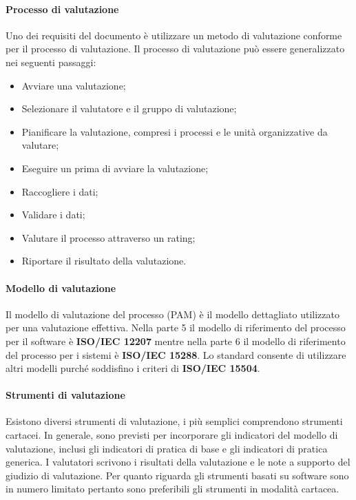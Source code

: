 \documentclass[../piano-di-qualifica.tex]{subfiles}
\begin{document}
\paragraph{Processo di valutazione}
\label{sub:processo_di_valutazione}
Uno dei requisiti del documento è utilizzare un metodo di valutazione conforme per il processo di valutazione.
Il processo di valutazione può essere generalizzato nei seguenti passaggi:
\begin{itemize}
    \item Avviare una valutazione;
    \item Selezionare il valutatore e il gruppo di valutazione;
    \item Pianificare la valutazione, compresi i processi e le unità organizzative da valutare;
    \item Eseguire un  prima di avviare la valutazione;
    \item Raccogliere i dati;
    \item Validare i dati;
    \item Valutare il processo attraverso un rating;
    \item Riportare il risultato della valutazione.
\end{itemize}

\paragraph{Modello di valutazione}
\label{sub:modello_di_valutazione}
Il modello di valutazione del processo (PAM) è il modello dettagliato utilizzato per una valutazione effettiva.
Nella parte 5 il modello di riferimento del processo per il software è \textbf{ISO/IEC 12207} mentre nella parte 6 il modello di riferimento del processo per i sistemi è \textbf{ISO/IEC 15288}.
Lo standard consente di utilizzare altri modelli purché soddisfino i criteri di \textbf{ISO/IEC 15504}.

\paragraph{Strumenti di valutazione}
\label{sub:strumenti_di_valutazione}
Esistono diversi strumenti di valutazione, i più semplici comprendono strumenti cartacei. In generale, sono previsti per incorporare gli indicatori del modello di valutazione, inclusi gli indicatori di pratica di base e gli indicatori di pratica generica. I valutatori scrivono i risultati della valutazione e le note a supporto del giudizio di valutazione.
Per quanto riguarda gli strumenti basati su software sono in numero limitato pertanto sono preferibili gli strumenti in modalità cartacea.
\end{document}
